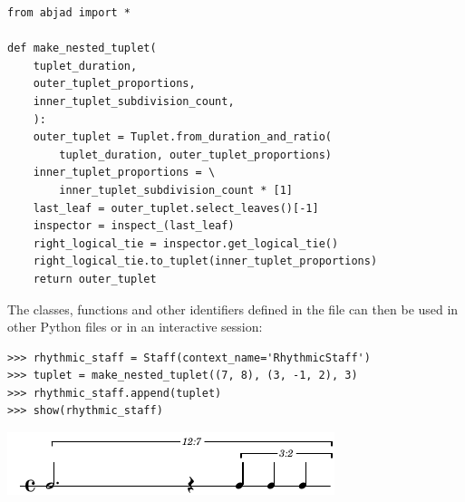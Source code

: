 \documentclass{article}
\begin{document}

\begin{lstlisting}
from abjad import *

def make_nested_tuplet(
    tuplet_duration,
    outer_tuplet_proportions,
    inner_tuplet_subdivision_count,
    ):
    outer_tuplet = Tuplet.from_duration_and_ratio(
        tuplet_duration, outer_tuplet_proportions)
    inner_tuplet_proportions = \
        inner_tuplet_subdivision_count * [1]
    last_leaf = outer_tuplet.select_leaves()[-1]
    inspector = inspect_(last_leaf)
    right_logical_tie = inspector.get_logical_tie()
    right_logical_tie.to_tuplet(inner_tuplet_proportions)
    return outer_tuplet
\end{lstlisting}

\noindent The classes, functions and other identifiers defined in the file can then be used in other Python files or in an interactive session:

\begin{lstlisting}
>>> rhythmic_staff = Staff(context_name='RhythmicStaff')
>>> tuplet = make_nested_tuplet((7, 8), (3, -1, 2), 3)
>>> rhythmic_staff.append(tuplet)
>>> show(rhythmic_staff)
\end{lstlisting}
\noindent\includegraphics{assets/lilypond-a8fcfb8f401a81a10afeb01a4f9f03ab.pdf}
\end{document}
